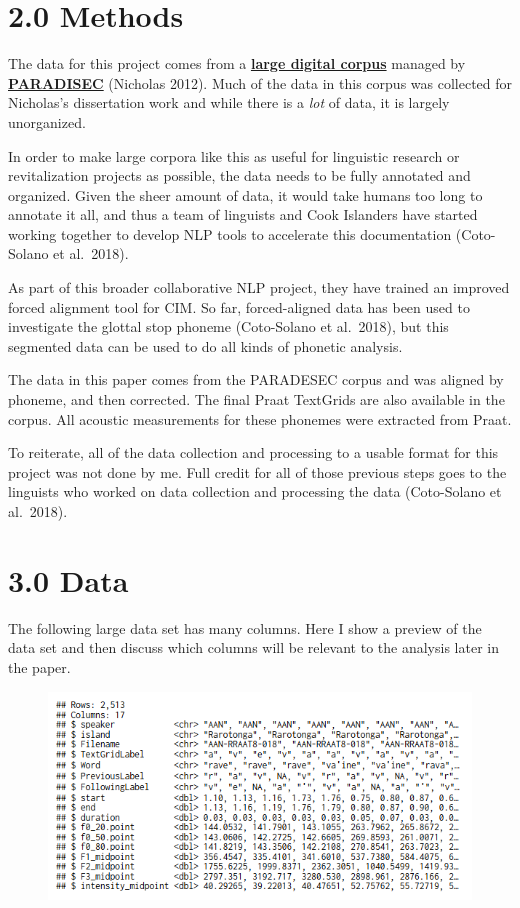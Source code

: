 \documentclass[
  ,man,floatsintext]{apa6}
\begin{document}
\section{2.0 Methods}\label{methods}

The data for this project comes from a \href{https://catalog.paradisec.org.au/collections/SN1}{\textbf{large digital corpus}} managed by \href{https://www.paradisec.org.au/}{\textbf{PARADISEC}} (Nicholas 2012). Much of the data in this corpus was collected for Nicholas's dissertation work and while there is a \emph{lot} of data, it is largely unorganized.

In order to make large corpora like this as useful for linguistic research or revitalization projects as possible, the data needs to be fully annotated and organized. Given the sheer amount of data, it would take humans too long to annotate it all, and thus a team of linguists and Cook Islanders have started working together to develop NLP tools to accelerate this documentation (Coto-Solano et al.~2018).

As part of this broader collaborative NLP project, they have trained an improved forced alignment tool for CIM. So far, forced-aligned data has been used to investigate the glottal stop phoneme (Coto-Solano et al.~2018), but this segmented data can be used to do all kinds of phonetic analysis.

The data in this paper comes from the PARADESEC corpus and was aligned by phoneme, and then corrected. The final Praat TextGrids are also available in the corpus. All acoustic measurements for these phonemes were extracted from Praat.

To reiterate, all of the data collection and processing to a usable format for this project was not done by me. Full credit for all of those previous steps goes to the linguists who worked on data collection and processing the data (Coto-Solano et al.~2018).

\section{3.0 Data}\label{data}

The following large data set has many columns. Here I show a preview of the data set and then discuss which columns will be relevant to the analysis later in the paper.

\begin{figure}

{\centering \includegraphics[width=0.8\linewidth]{./figs/raw_data} 

}

\caption{ }\label{fig:unnamed-chunk-2}
\end{figure}
\end{document}
